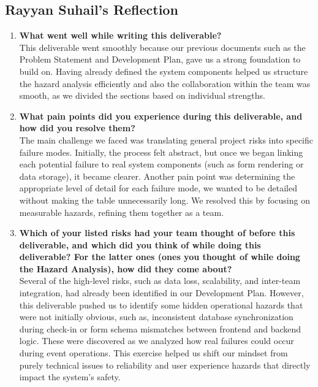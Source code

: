 \documentclass{article}
\begin{document}
\subsection*{Rayyan Suhail's Reflection}
\begin{enumerate}
    \item \textbf{What went well while writing this deliverable?} \\

    This deliverable went smoothly because our previous documents such as the Problem Statement and Development Plan, gave us a strong foundation to build on. Having already defined the system components helped us structure the hazard analysis efficiently and also the collaboration within the team was smooth, as we divided the sections based on individual strengths. 

    \item \textbf{What pain points did you experience during this deliverable, and how did you resolve them?} \\

    The main challenge we faced was translating general project risks into specific failure modes. Initially, the process felt abstract, but once we began linking each potential failure to real system components (such as form rendering or data storage), it became clearer. Another pain point was determining the appropriate level of detail for each failure mode, we wanted to be detailed without making the table unnecessarily long. We resolved this by focusing on measurable hazards, refining them together as a team. 

    \item \textbf{Which of your listed risks had your team thought of before this deliverable, and which did you think of while doing this deliverable? For the latter ones (ones you thought of while doing the Hazard Analysis), how did they come about?} \\

    Several of the high-level risks, such as data loss, scalability, and inter-team integration, had already been identified in our Development Plan. However, this deliverable pushed us to identify some hidden operational hazards that were not initially obvious, such as, inconsistent database synchronization during check-in or form schema mismatches between frontend and backend logic. These were discovered as we analyzed how real failures could occur during event operations. This exercise helped us shift our mindset from purely technical issues to reliability and user experience hazards that directly impact the system’s safety.


\end{enumerate}
\end{document}
